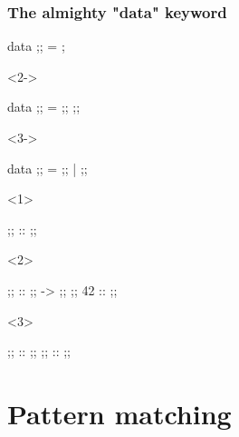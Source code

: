 \documentclass[17pt]{beamer}
\renewcommand{\(}[1]{\begin{columns}[#1]}
\renewcommand{\)}{\end{columns}}
\newcommand{\<}[1]{\begin{column}{#1}}
\renewcommand{\>}{\end{column}}
\begin{document}
\begin{frame}[fragile]
\frametitle{The almighty "data" keyword}
\begin{code}
    data ;;    = ;
\end{code}
\begin{uncoverenv}<2->
\begin{code}
    data ;; = ;; ;;
\end{code}
\end{uncoverenv}
\begin{uncoverenv}<3->
\begin{code}
    data ;;    =   ;; | ;;
\end{code}
\end{uncoverenv}
\begin{minipage}[t][.3\textheight]{\textwidth}
\begin{center}
\begin{onlyenv}<1>
\begin{code}
                      ;; :: ;;
\end{code}
\end{onlyenv}
\begin{onlyenv}<2>
\begin{code}
                ;;    :: ;; -> ;;
                ;; 42 ::        ;;
\end{code}
\end{onlyenv}
\begin{onlyenv}<3>
\begin{code}
                     ;;  :: ;;
                     ;; :: ;;
\end{code}
\end{onlyenv}
\end{center}
\end{minipage}
\end{frame}


\section{Pattern matching}
\end{document}
